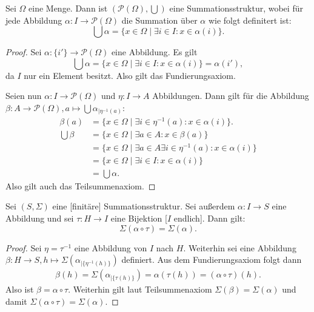 \documentclass{article}
\begin{document}
\begin{theorem}
  Sei $\Omega$ eine Menge. Dann ist $(\mathcal{P}(\Omega), \bigcup)$ eine Summationsstruktur,
  wobei für jede Abbildung $\alpha \colon I \to \mathcal{P}(\Omega)$ die Summation über $\alpha$ wie folgt
  definitert ist:
  \begin{equation*}
    \bigcup \alpha = \{ x \in \Omega \mid \exists i \in I \colon x \in \alpha(i) \}.
  \end{equation*}
\end{theorem}
\begin{proof}
  Sei $\alpha \colon \{ i' \} \to \mathcal{P}(\Omega)$ eine Abbildung.
  Es gilt
  \begin{equation*}
    \bigcup \alpha = \{ x \in \Omega \mid \exists i \in I \colon x \in \alpha(i) \}
    = \alpha(i'),
  \end{equation*}
  da $I$ nur ein Element besitzt. Also gilt das Fundierungsaxiom.

  Seien nun $\alpha \colon I \to \mathcal{P}(\Omega)$ und $\eta \colon I \to A$ Abbildungen.
  Dann gilt für die Abbildung 
  $\beta \colon A \to \mathcal{P}(\Omega), a \mapsto \bigcup \alpha_{\mid \eta^{-1}(a)}$:
  \begin{align*}
    \beta(a) &= \{ x \in \Omega \mid \exists i \in \eta^{-1}(a) \colon x \in \alpha(i) \}.\\
    \bigcup \beta &= \{ x \in \Omega \mid \exists a \in A \colon x \in \beta(a) \}\\
    &= \{ x \in \Omega \mid \exists a \in A \exists i \in \eta^{-1}(a) \colon x \in \alpha(i) \}\\
    &= \{ x \in \Omega \mid \exists i \in I \colon x \in \alpha(i) \}\\
    &= \bigcup \alpha.
  \end{align*}
  Also gilt auch das Teilsummenaxiom.
\end{proof}

\begin{theorem}
  Sei $(S, \Sigma)$ eine [finitäre] Summationsstruktur.
  Sei außerdem $\alpha \colon I \to S$ eine Abbildung 
  und sei $\tau \colon H \to I$ eine Bijektion [$I$ endlich].
  Dann gilt:
  \begin{equation*}
    \Sigma(\alpha \circ \tau) = \Sigma(\alpha).
  \end{equation*}
\end{theorem}
\begin{proof}
  Sei $\eta = \tau^{-1}$ eine Abbildung von $I$ nach $H$.
  Weiterhin sei eine Abbildung $\beta \colon H \to S, h \mapsto \Sigma(\alpha_{\mid \{\eta^{-1}(h) \}})$ definiert.
  Aus dem Fundierungsaxiom folgt dann 
  \begin{align*}
    \beta(h) = \Sigma(\alpha_{\mid \{ \tau(h) \}}) = \alpha(\tau(h)) = (\alpha \circ \tau)(h).
  \end{align*}
  Also ist $\beta = {\alpha \circ \tau}$.
  Weiterhin gilt laut Teilsummenaxiom $\Sigma(\beta) = \Sigma(\alpha)$ und damit $\Sigma({\alpha \circ \tau}) = \Sigma(\alpha)$.
\end{proof}
\end{document}
